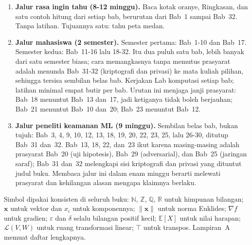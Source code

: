 \begin{enumerate}
  \item \textbf{Jalur rasa ingin tahu (8-12 minggu).} Baca kotak oranye, Ringkasan,
        dan satu contoh hitung dari setiap bab, berurutan dari Bab~1 sampai Bab~32.
        Tanpa latihan. Tujuannya satu: tahu peta medan.
  \item \textbf{Jalur mahasiswa (2 semester).} Semester pertama: Bab~1-10 dan
        Bab~17. Semester kedua: Bab~11-16 lalu 18-32. Itu dua puluh satu bab, lebih
        banyak dari satu semester biasa; cara memangkasnya tanpa memutus prasyarat
        adalah menunda Bab~31-32 (kriptografi dan privasi) ke mata kuliah pilihan,
        sehingga tersisa sembilan belas bab. Kerjakan Lab komputasi setiap bab;
        latihan minimal empat butir per bab. Urutan ini menjaga janji prasyarat:
        Bab~18 menuntut Bab~13 dan~17, jadi ketiganya tidak boleh berjauhan; Bab~21
        menuntut Bab~10 dan~20; Bab~23 menuntut Bab~12.
  \item \textbf{Jalur peneliti keamanan ML (9 minggu).} Sembilan belas bab, bukan
        tujuh: Bab~3, 4, 9, 10, 12, 13, 18, 19, 20, 22, 23, 25, lalu 26-30, ditutup
        Bab~31 dan~32. Bab~13, 18, 22, dan~23 ikut karena masing-masing adalah
        prasyarat Bab~20 (uji hipotesis), Bab~29 (adversarial), dan Bab~25 (jaringan
        saraf); Bab~31 dan~32 melengkapi sisi kriptografi dan privasi yang dituntut
        judul buku. Membaca jalur ini dalam enam minggu berarti melewati prasyarat
        dan kehilangan alasan mengapa klaimnya berlaku.
\end{enumerate}

Simbol dipakai konsisten di seluruh buku: $\mathbb{N}$, $\mathbb{Z}$, $\mathbb{Q}$,
$\mathbb{R}$ untuk himpunan bilangan; $\mathbf{x}$ untuk vektor dan $x_i$ untuk
komponennya; $\|\mathbf{x}\|$ untuk norma Euklides; $\nabla f$ untuk gradien;
$\varepsilon$ dan $\delta$ selalu bilangan positif kecil; $\mathbb{E}[X]$ untuk
nilai harapan; $\mathcal{L}(V,W)$ untuk ruang transformasi linear; $\top$ untuk
transpos. Lampiran~A memuat daftar lengkapnya.
